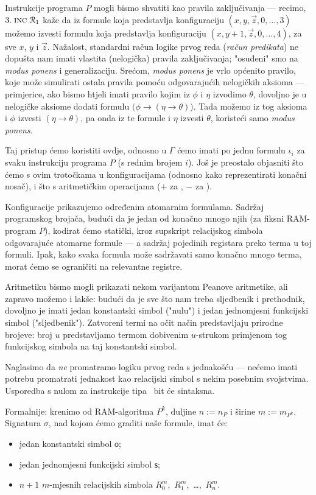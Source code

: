 Instrukcije programa $P$ mogli bismo shvatiti kao pravila zaključivanja --- recimo, $3.\;\textsc{inc}\;\mathcal R_{1}$ kaže da iz formule koja predstavlja konfiguraciju $(x,y,\vec z,0,\dotsc,3)$ možemo izvesti formulu koja predstavlja konfiguraciju $(x,y\!+\!1,\vec z,0,\dotsc,4)$, za sve $x$, $y$ i $\vec z$. Nažalost, standardni račun logike prvog reda (\emph{račun predikata}) ne dopušta nam imati vlastita (nelogička) pravila zaključivanja; "osuđeni" smo na \emph{modus ponens} i generalizaciju. Srećom, \emph{modus ponens} je vrlo općenito pravilo, koje može simulirati ostala pravila pomoću odgovarajućih nelogičkih aksioma --- primjerice, ako bismo htjeli imati pravilo kojim iz $\phi$ i $\eta$ izvodimo $\theta$, dovoljno je u nelogičke aksiome dodati formulu $\bigl(\phi\to(\eta\to\theta)\bigr)$. Tada možemo iz tog aksioma i $\phi$ izvesti $(\eta\to\theta)$, pa onda iz te formule i $\eta$ izvesti $\theta$, koristeći samo \emph{modus ponens}.

Taj pristup ćemo koristiti ovdje, odnosno u $\Gamma$ ćemo imati po jednu formulu $\iota_i$ za svaku instrukciju programa $P$ (s rednim brojem $i$). Još je preostalo objasniti što ćemo s ovim trotočkama u konfiguracijama (odnosno kako reprezentirati konačni nosač), i što s aritmetičkim operacijama ($+$ za \inc, $-$ za \dec).

Konfiguracije prikazujemo određenim atomarnim formulama. Sadržaj programskog brojača, budući da je jedan od konačno mnogo njih (za fiksni RAM-program $P$), kodirat ćemo statički, kroz supskript relacijskog simbola odgovarajuće atomarne formule --- a sadržaj pojedinih registara preko terma u toj formuli. Ipak, kako svaka formula može sadržavati samo konačno mnogo terma, morat ćemo se ograničiti na relevantne registre.

Aritmetiku bismo mogli prikazati nekom
varijantom Peanove aritmetike, ali zapravo možemo i lakše: budući da je sve što nam treba sljedbenik i prethodnik, dovoljno je imati jedan konstantski simbol ("nulu") i jedan jednomjesni funkcijski simbol ("sljedbenik"). Zatvoreni termi na očit način predstavljaju prirodne brojeve: broj $u$ predstavljamo termom dobivenim $u$-strukom primjenom tog funkcijskog simbola na taj konstantski simbol.

Naglasimo da \emph{ne} promatramo logiku prvog reda s jednakošću --- nećemo imati potrebu promatrati jednakost kao relacijski simbol s nekim posebnim svojstvima. Usporedba s nulom za instrukcije tipa \dec\ bit će sintaksna.

Formalnije: krenimo od RAM-algoritma $P^k$, duljine $n:=n_P$ i širine $m:=m_{P^k}$.\\ Signatura $\sigma$, nad kojom ćemo graditi naše formule, imat će:
\begin{itemize}
    \item jedan konstantski simbol $\mathsf o$;
    \item jedan jednomjesni funkcijski simbol $\mathsf s$;
    \item $n+1$ $m$-mjesnih relacijskih simbola $R_0^m$,~$R_1^m$,~\ldots,~$R_n^m$.
\end{itemize}


